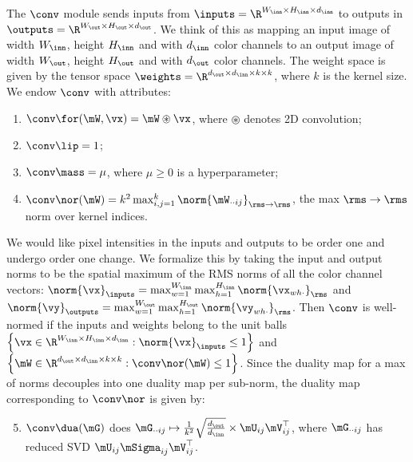 \begin{myexample} The $\conv$ module sends inputs from $\inputs = \R^{W_\inn\times H_\inn\times d_\inn}$ to outputs in $\outputs = \R^{W_\out \times H_\out \times d_\out}$. We think of this as mapping an input image of width $W_\inn$, height $H_\inn$ and with $d_\inn$ color channels to an output image of width $W_\out$, height $H_\out$ and with $d_\out$ color channels. The weight space is given by the tensor space $\weights = \R^{d_\out \times d_\inn\times k \times k}$, where $k$ is the kernel size. We endow $\conv$ with attributes:

\begin{enumerate}
\setlength\itemsep{0em}
    \item $\conv\for(\mW,\vx) = \mW\circledast\vx$, where $\circledast$ denotes 2D convolution;
    \item $\conv\lip = 1$;
    \item $\conv\mass = \mu$, where $\mu\geq 0$ is a hyperparameter;
    \item $\conv\nor(\mW) = k^2 \max_{i,j=1}^k \norm{\mW_{\cdot \cdot ij}}_{\rms \to \rms}$, the max $\rms\to\rms$ norm over kernel indices.
\end{enumerate}
We would like pixel intensities in the inputs and outputs to be order one and undergo order one change. We formalize this by taking the input and output norms to be the spatial maximum of the RMS norms of all the color channel vectors: $\norm{\vx}_\inputs = \max_{w=1}^{W_\inn}\max_{h=1}^{H_\inn} \norm{\vx_{wh\cdot}}_\rms$ and $\norm{\vy}_\outputs = \max_{w=1}^{W_\out}\max_{h=1}^{H_\out} \norm{\vy_{wh\cdot}}_\rms$. Then $\conv$ is well-normed if the inputs and weights belong to the unit balls $\left\{\vx\in\R^{W_\inn\times H_\inn\times d_\inn}:\norm{\vx}_\inputs \leq 1\right\}$ and $\left\{\mW \in \R^{d_\out\times d_\inn\times k \times k}:\conv\nor(\mW)\leq1\right\}$. Since the duality map for a max of norms decouples into one duality map per sub-norm, the duality map corresponding to $\conv\nor$ is given by:

\begin{enumerate}
\setcounter{enumi}{4}
\setlength\itemsep{0em}
    \item $\conv\dua(\mG)$ does $\mG_{\cdot\cdot ij} \mapsto \frac{1}{k^2} \sqrt{\frac{d_\out}{d_\inn}} \times \mU_{ij} \mV_{ij}^\top$, where $\mG_{\cdot\cdot ij}$ has reduced SVD $\mU_{ij}\mSigma_{ij}\mV_{ij}^\top$.
\end{enumerate}
\end{myexample}

